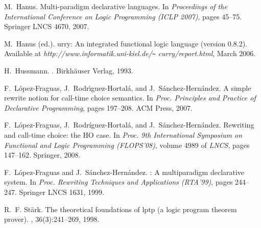 \documentclass{llncs}
\begin{document}
\begin{thebibliography}{10}
M.~Hanus.
\newblock Multi-paradigm declarative languages.
\newblock In {\em Proceedings of the International Conference on Logic
  Programming (ICLP 2007)}, pages 45--75. Springer LNCS 4670, 2007.

M.~H{anus (ed.)}.
urry: An integrated functional logic language (version 0.8.2).
\newblock Available at {\it http://www.informatik.uni-kiel.de/\verb+~+}{\it
  curry/}{\it report.html}, March 2006.

H.~Hussmann.
.
\newblock Birkh\"auser Verlag, 1993.

F.~L{\'opez-Fraguas}, J.~R{odr\'{\i}guez-Hortal\'a}, and
  J.~S{\'anchez-Hern\'andez}.
\newblock A simple rewrite notion for call-time choice semantics.
\newblock In {\em Proc. Principles and Practice of Declarative Programming},
  pages 197--208. ACM Press, 2007.

F.~L{\'opez-Fraguas}, J.~R{odr\'iguez-Hortal\'a}, and
  J.~S{\'anchez-Hern\'andez}.
\newblock Rewriting and call-time choice: the {HO} case.
\newblock In {\em Proc. 9th International Symposium on Functional and Logic
  Programming (FLOPS'08)}, volume 4989 of {\em LNCS}, pages 147--162. Springer,
  2008.

F.~L{\'opez-Fraguas} and J.~S{\'anchez-Hern\'andez}.
\newblock : A multiparadigm declarative system.
\newblock In {\em Proc. Rewriting Techniques and Applications (RTA'99)}, pages
  244--247. Springer LNCS 1631, 1999.

R.~F. St{\"a}rk.
\newblock The theoretical foundations of lptp (a logic program theorem prover).
, 36(3):241--269, 1998.

\end{thebibliography}
\end{document}
